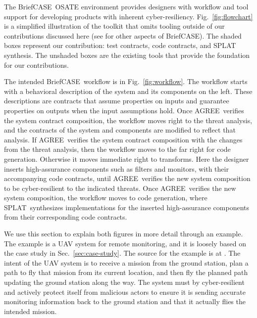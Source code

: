 \documentclass[global,twocolumn]{svjour}
\newcommand{\figref}[1]{Fig.~\ref{#1}}
\newcommand{\secref}[1]{Sec.~\ref{#1}}
\newcommand{\brfcs}{BriefCASE}
\newcommand{\agr}{AGREE}
\newcommand{\splt}{SPLAT}
\begin{document}
The \brfcs\ OSATE environment provides designers with workflow and tool support for developing products with
inherent cyber-resiliency.
%
\figref{fig:flowchart} is a simplified illustration of the toolkit that omits tooling outside of our contributions discussed here (see \cite{dcrypps2019,gearcase2020,resolute-destion,attestation-copland,awas,hamr,sel4-sosp09, sel4-tocs14, sel4-cacm18} for other aspects of \brfcs).
%
The shaded boxes represent our contribution: test contracts, code contracts, and SPLAT synthesis.
The unshaded boxes are the existing tools that provide the foundation for our contributions.

The intended \brfcs\ workflow is in \figref{fig:workflow}.
%
The workflow starts with a behavioral description of the system and its components on the left.
%
These descriptions are contracts that assume properties on inputs and guarantee properties on outputs when the input assumptions hold.
Once \agr\ verifies the system contract composition, the workflow moves right to the threat analysis, and the contracts of the system and components are modified to reflect that analysis.
%
If \agr\ verifies the system contract composition with the changes from the threat analysis, then the workflow moves to the far right for code generation.
%
Otherwise it moves immediate right to transforms.
Here the designer inserts high-assurance components such as filters and monitors, with their accompanying code contracts, until \agr\ verifies the new system composition to be cyber-resilient to the indicated threats.
%
Once \agr\ verifies the new system composition, the workflow moves to code generation, where \splt\ synthesizes implementations for the inserted high-assurance components from their corresponding code contracts.

We use this section to explain both figures in more detail through an example.
%
The example is a UAV system for remote monitoring, and it is loosely based on
the case study in \secref{sec:case-study}.
%
The source for the example is at \cite{repo}.
%
The intent of the UAV system is to receive a mission from the ground station, plan a path to fly that mission from its current location, and then fly the planned path updating the ground station along the way.
%
The system must by cyber-resilient and actively protect itself from malicious actors to ensure it is sending accurate monitoring information back to the ground station and that it actually flies the intended mission.

\end{document}

